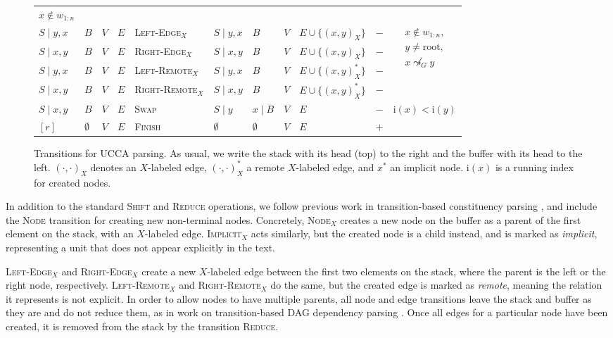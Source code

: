 \documentclass[11pt]{article}
\begin{document}
\begin{figure*}
\begin{adjustbox}{width=\textwidth,margin=3pt,frame}
\begin{tabular}{llll|l|llllc|c}
$x \not\in w_{1:n}$ \\
\cline{11-11}
$S \;|\; y,x$ & $B$ & $V$ & $E$ & \textsc{Left-Edge$_X$} & $S \;|\; y,x$ & $B$ & $V$ & $E \cup \{ (x,y)_X \}$ & $-$ &
\multirow{4}{50pt}{$\begin{aligned}
x \not\in w_{1:n},\\
y \neq \mathrm{root},\\
x \not\leadsto_G y
\end{aligned}$} \\
$S \;|\; x,y$ & $B$ & $V$ & $E$ & \textsc{Right-Edge$_X$} & $S \;|\; x,y$ & $B$ & $V$ & $E \cup \{ (x,y)_X \}$ & $-$ & \\
$S \;|\; y,x$ & $B$ & $V$ & $E$ & \textsc{Left-Remote$_X$} & $S \;|\; y,x$ & $B$ & $V$ & $E \cup \{ (x,y)_X^* \}$ & $-$ & \\
$S \;|\; x,y$ & $B$ & $V$ & $E$ & \textsc{Right-Remote$_X$} & $S \;|\; x,y$ & $B$ & $V$ & $E \cup \{ (x,y)_X^* \}$ & $-$ & \\
\cline{11-11}
$S \;|\; x,y$ & $B$ & $V$ & $E$ & \textsc{Swap} & $S \;|\; y$ & $x \;|\; B$ & $V$ & $E$ & $-$ &
$\mathrm{i}(x) < \mathrm{i}(y)$ \\
\cline{11-11}
$[r]$ & $\emptyset$ & $V$ & $E$ & \textsc{Finish} & $\emptyset$ & $\emptyset$ & $V$ & $E$ & $+$ & \\
\end{tabular}
\end{adjustbox}
\caption{\label{fig:transitions}
Transitions for UCCA parsing.
As usual, we write the stack with its head (top) to the right and the buffer with its head to the left.
$(\cdot,\cdot)_X$ denotes an $X$-labeled edge, $(\cdot,\cdot)_X^*$ a remote $X$-labeled edge, and $x^*$ an implicit node.
$\mathrm{i}(x)$ is a running index for created nodes.
}
\end{figure*}

In addition to the standard \textsc{Shift} and \textsc{Reduce} operations, 
we follow previous work in transition-based constituency parsing \cite{zhu2013fast}, and include the \textsc{Node} transition for creating new non-terminal nodes.
Concretely, \textsc{Node$_X$} creates a new node on the buffer as a parent of the first element on the stack, with an $X$-labeled edge. \textsc{Implicit$_X$} acts similarly, but the created node is a child instead,
and is marked as \textit{implicit}, representing a unit that does not appear explicitly in the text.

\textsc{Left-Edge$_X$} and \textsc{Right-Edge$_X$} create a new $X$-labeled edge between the first two elements on the stack, where the parent is the left or the right node, respectively. \textsc{Left-Remote$_X$} and \textsc{Right-Remote$_X$} do the same, but the created edge is marked as \textit{remote}, meaning the relation it represents is not explicit.
In order to allow nodes to have multiple parents, all node and edge transitions leave the
stack and buffer as they are and do not reduce them,
as in work on transition-based DAG dependency parsing \cite{sagae2008shift,tokgoz2015transition}.
Once all edges for a particular node have been created, it is removed from the stack
by the transition \textsc{Reduce}.
\end{document}

